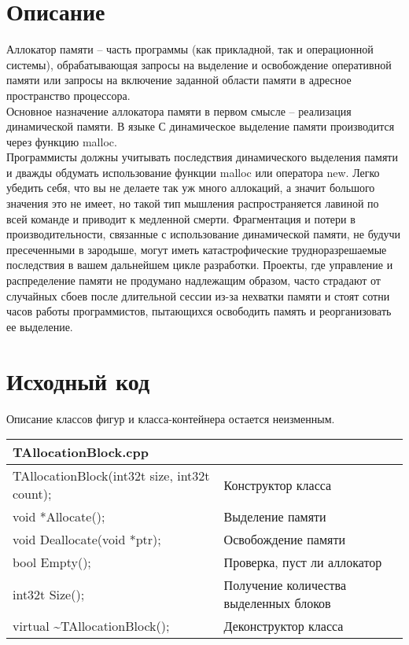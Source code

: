\section{Описание}

Аллокатор памяти -- часть программы (как прикладной, так и операционной системы), обрабатывающая запросы на выделение и освобождение оперативной памяти или запросы на включение заданной области памяти в адресное пространство процессора. \\
Основное назначение аллокатора памяти в первом смысле -- реализация динамической памяти. В языке С динамическое выделение памяти производится через функцию malloc. \\
Программисты должны учитывать последствия динамического выделения памяти и дважды обдумать использование функции malloc или оператора new. Легко убедить себя, что вы не делаете так уж много аллокаций, а значит большого значения это не имеет, но такой тип мышления распространяется лавиной по всей команде и приводит к медленной смерти. Фрагментация и потери в производительности, связанные с использование динамической памяти, не будучи пресеченными в зародыше, могут иметь катастрофические трудноразрешаемые последствия в вашем дальнейшем цикле разработки. Проекты, где управление и распределение памяти не продумано надлежащим образом, часто страдают от случайных сбоев после длительной сессии из-за нехватки памяти и стоят сотни часов работы программистов, пытающихся освободить память и реорганизовать ее выделение. \\


\section{Исходный код}

Описание классов фигур и класса-контейнера остается неизменным.\\

\begin{longtable}{|p{7.5cm}|p{7.5cm}|}
\rowcolor{lightgray}
\multicolumn{2}{|c|} {TAllocationBlock.cpp}\\
\hline
TAllocationBlock(int32t size, int32t count);&Конструктор класса\\
\hline
void *Allocate();&Выделение памяти\\
\hline
void Deallocate(void *ptr);&Освобождение памяти\\
\hline
bool Empty();&Проверка, пуст ли аллокатор\\
\hline
int32t Size();&Получение количества выделенных блоков\\
\hline
virtual \textasciitilde TAllocationBlock();&Деконструктор класса\\
\hline
\end{longtable}

